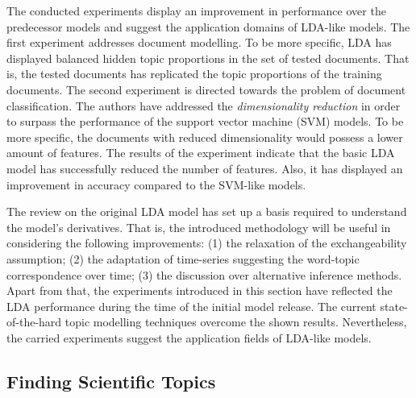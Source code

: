 \documentclass{mprop}
\begin{document}
\par The conducted experiments display an improvement in performance over the predecessor models and suggest the application domains of LDA-like models. The first experiment addresses document modelling. To be more specific, LDA has displayed balanced hidden topic proportions in the set of tested documents. That is, the tested documents has replicated the topic proportions of the training documents. The second experiment is directed towards the problem of document classification. The authors have addressed the \textit{dimensionality reduction} in order to surpass the performance of the support vector machine (SVM) models. To be more specific, the documents with reduced dimensionality would possess a lower amount of features. The results of the experiment indicate that the basic LDA model has successfully reduced the number of features. Also, it has displayed an improvement in accuracy compared to the SVM-like models. 

\par The review on the original LDA model has set up a basis required to understand the model's derivatives. That is, the introduced methodology will be useful in considering the following improvements: (1) the  relaxation of the exchangeability assumption; (2) the adaptation of time-series suggesting the word-topic correspondence over time; (3) the discussion over alternative inference methods. Apart from that, the experiments introduced in this section have reflected the LDA performance during the time of the initial model release. The current state-of-the-hard topic modelling techniques overcome the shown results. Nevertheless, the carried experiments suggest the application fields of LDA-like models.

\subsection{Finding Scientific Topics}
\end{document}
